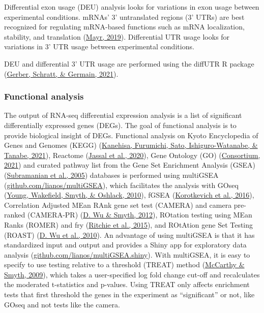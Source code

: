 \documentclass[12pt,twoside]{reedthesis}
\begin{document}
Differential exon usage (DEU) analysis looks for variations in exon
usage between experimental conditions. mRNAs' 3' untranslated regions
(3' UTRs) are best recognized for regulating mRNA-based functions such
as mRNA localization, stability, and translation (\protect\hyperlink{ref-mayr2019}{Mayr, 2019}).
Differential UTR usage looks for variations in 3' UTR usage between
experimental conditions.

DEU and differential 3' UTR usage are performed using the diffUTR R
package (\protect\hyperlink{ref-gerber2021}{Gerber, Schratt, \& Germain, 2021}).

\hypertarget{m3.2.7}{%
\subsubsection*{Functional analysis}\label{m3.2.7}}

The output of RNA-seq differential expression analysis is a list of
significant differentially expressed genes (DEGs). The goal of
functional analysis is to provide biological insight of DEGs. Functional
analysis on Kyoto Encyclopedia of Genes and Genomes (KEGG)
(\protect\hyperlink{ref-kanehisa2021}{Kanehisa, Furumichi, Sato, Ishiguro-Watanabe, \& Tanabe, 2021}), Reactome (\protect\hyperlink{ref-jassal2020}{Jassal et al., 2020}), Gene Ontology (GO)
(\protect\hyperlink{ref-consortium2021}{Consortium, 2021}) and curated pathway list from the Gene Set Enrichment
Analysis (GSEA) (\protect\hyperlink{ref-subramanian2005}{Subramanian et al., 2005}) databases is performed using
multiGSEA
(\href{https://github.com/lianos/multiGSEA}{github.com/lianos/multiGSEA}),
which facilitates the analysis with GOseq (\protect\hyperlink{ref-young2010}{Young, Wakefield, Smyth, \& Oshlack, 2010}), fGSEA
(\protect\hyperlink{ref-korotkevich2016}{Korotkevich et al., 2016}), Correlation Adjusted MEan RAnk gene set test
(CAMERA) and camera pre-ranked (CAMERA-PR) (\protect\hyperlink{ref-wu2012}{D. Wu \& Smyth, 2012}), ROtation testing
using MEan Ranks (ROMER) and fry (\protect\hyperlink{ref-ritchie2015}{Ritchie et al., 2015}), and ROtAtion gene Set
Testing (ROAST) (\protect\hyperlink{ref-wu2010}{D. Wu et al., 2010}). An advantage of using multiGSEA is that it
has standardized input and output and provides a Shiny app for
exploratory data analysis
(\href{https://github.com/lianos/multiGSEA.shiny}{github.com/lianos/multiGSEA.shiny}).
With multiGSEA, it is easy to specify to use testing relative to a
threshold (TREAT) method (\protect\hyperlink{ref-mccarthy2009}{McCarthy \& Smyth, 2009}), which takes a user-specified
log fold change cut-off and recalculates the moderated t-statistics and
p-values. Using TREAT only affects enrichment tests that first threshold
the genes in the experiment as ``significant'' or not, like GOseq and not
tests like the camera.
\end{document}
